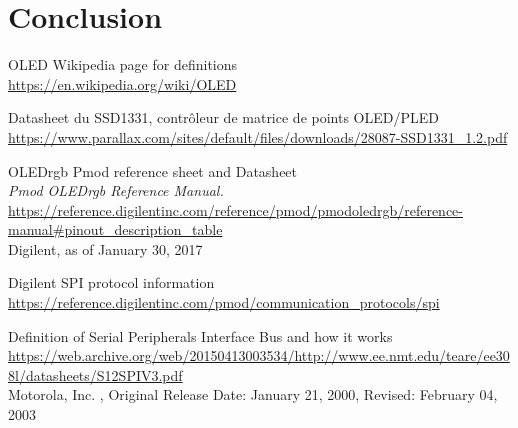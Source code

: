 \documentclass[11pt]{article}
\begin{document}
\newpage

\section{Conclusion}

\clearpage
\begin{thebibliography}{9}


OLED Wikipedia page for definitions\\
\url{https://en.wikipedia.org/wiki/OLED}

Datasheet du SSD1331, contrôleur de matrice de points OLED/PLED\\
\url{https://www.parallax.com/sites/default/files/downloads/28087-SSD1331\_1.2.pdf}

OLEDrgb Pmod reference sheet and Datasheet\\
\textit{Pmod OLEDrgb Reference Manual.} \\
\url{https://reference.digilentinc.com/reference/pmod/pmodoledrgb/reference-manual#pinout_description_table}\\
Digilent, as of January 30, 2017

Digilent SPI protocol information\\
\url{https://reference.digilentinc.com/pmod/communication\_protocols/spi}

Definition of Serial Peripherals Interface Bus and how it works\\
\url{https://web.archive.org/web/20150413003534/http://www.ee.nmt.edu/teare/ee308l/datasheets/S12SPIV3.pdf}\\
Motorola, Inc. , Original Release Date: January 21, 2000, Revised: February 04, 2003

\end{thebibliography}
\end{document}
